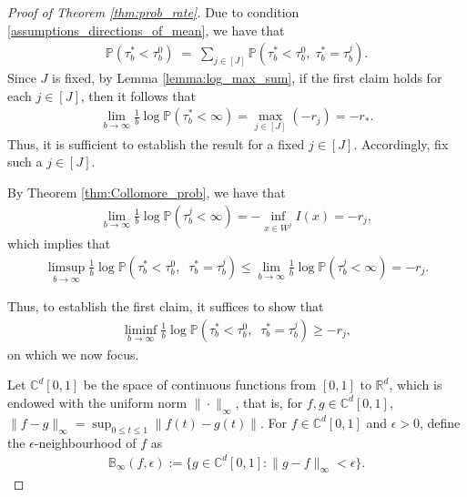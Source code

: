 \documentclass[aap,preprint]{imsart}
\newcommand{\Pro}{{\mathbb{P}}}
\newcommand{\bR}{{\mathbb{R}}}
\theoremstyle{plain}
\theoremstyle{definition}
\begin{document}
\begin{appendix}
\begin{proof}[Proof of Theorem \ref{thm:prob_rate}]
Due to condition \eqref{assumptions_directions_of_mean}, we have that
\begin{align*}
       \Pro\left(\tau_b^* < \tau_b^{0} \right) 
\;=\;\sum_{j \in [J]}   \Pro\left(\tau_b^* < \tau_b^{0}, \; \tau_b^* = \tau_b^j \right) .
\end{align*}
Since $J$ is fixed, by Lemma \ref{lemma:log_max_sum}, 
if the first claim holds for each $j \in [J]$, then 
it follows that
\begin{align*}%
    \lim_{b \to \infty} \frac{1}{b} \log \Pro\left(\tau_b^* < \infty \right)  = \max_{j \in [J] } (-r_j) = -r_*.
\end{align*}
Thus, it is sufficient to establish the result for a fixed $j \in [J]$. Accordingly, fix such a $j \in [J]$.

By Theorem \ref{thm:Collomore_prob},   we have that 
\begin{align*}
    \lim_{b \to \infty} \frac{1}{b}\log\Pro\left(\tau_b^j < \infty \right) =  -\inf_{x \in W^j} I(x) = -r_j,
\end{align*}
which  implies that
\begin{align*}
\limsup_{b \to \infty}    \frac{1}{b} \log \Pro(\tau^{*}_b < \tau^{0}_b,\;\; \tau_b^{*} = \tau_b^{j} )\leq \lim_{b \to \infty} \frac{1}{b}\log\Pro\left(\tau_b^j < \infty \right) = -r_j.
\end{align*}

Thus, to establish the first claim, it suffices to show that
\begin{align}\label{aux_lower_bound}
\liminf_{b \to \infty}    \frac{1}{b} \log \Pro(\tau^{*}_b < \tau^{0}_b,\;\; \tau_b^{*} = \tau_b^{j} ) \geq -r_j,
\end{align}
on which we now focus.




Let $\mathbb{C}^d[0,1]$ be the space of continuous functions from $[0,1]$ to $\bR^d$, which is endowed with the uniform norm $\|\cdot\|_{\infty}$, that is, for $f,g \in \mathbb{C}^d[0,1]$, $\|f-g\|_{\infty} = \sup_{0\leq t \leq 1} \|f(t) - g(t)\|$. For $f \in \mathbb{C}^d[0,1]$ and $\epsilon > 0$, define the $\epsilon$-neighbourhood of $f$ as
\begin{align*}
    \mathbb{B}_{\infty}(f, \epsilon)  :=  \{ g \in  \mathbb{C}^d[0,1]: \|g-f\|_{\infty} < \epsilon\}.
\end{align*}



\end{proof}
\end{appendix}
\end{document}

